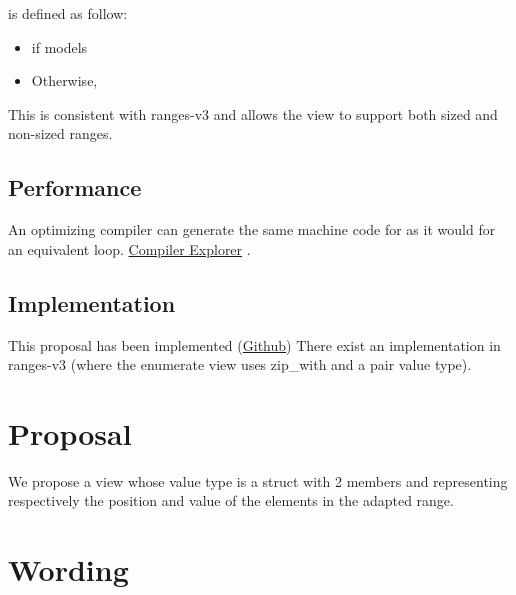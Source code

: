 \documentclass{wg21}
\begin{document}
 is defined as follow:
\begin{itemize}
    \item {} if  models 
    \item Otherwise, 
\end{itemize}

This is consistent with ranges-v3 and allows the view to support both sized and non-sized ranges.


\subsection{Performance}

An optimizing compiler can generate the same machine code for  as it would for an equivalent  loop.  \href{https://godbolt.org/z/2Kxo8d}{Compiler Explorer} .


\subsection{Implementation}

This proposal has been implemented (\href{https://github.com/cor3ntin/rangesnext/blob/master/include/cor3ntin/rangesnext/enumerate.hpp}{Github})
There exist an implementation in ranges-v3 (where the enumerate view uses zip_with and a pair value type).

\section{Proposal}

We propose a view  whose value type is a struct with 2 members  and 
representing respectively the position and value of the elements in the adapted range.

\section{Wording}
\end{document}
